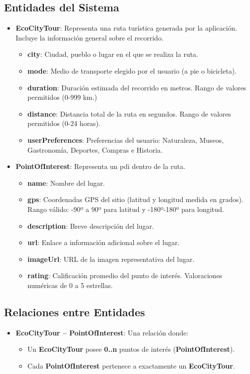 \subsection{Entidades del Sistema}
\begin{itemize}
	\item \textbf{EcoCityTour}: Representa una ruta turística generada por la aplicación. Incluye la información general sobre el recorrido.
	\begin{itemize}
		\item \textbf{city}: Ciudad, pueblo o lugar en el que se realiza la ruta.
		\item \textbf{mode}: Medio de transporte elegido por el usuario (a pie o bicicleta).
		\item \textbf{duration}: Duración estimada del recorrido en metros. Rango de valores permitidos (0-999 km.)
		\item \textbf{distance}: Distancia total de la ruta en segundos. Rango de valores permitidos (0-24 horas).
		\item \textbf{userPreferences}: Preferencias del usuario: Naturaleza, Museos, Gastronomía, Deportes, Compras e Historia.
	\end{itemize}

	\item {\textbf{PointOfInterest}}: Representa un \acrlong{pdi} dentro de la ruta.
	\begin{itemize}
		\item \textbf{name}: Nombre del lugar.
		\item \textbf{gps}: Coordenadas GPS del sitio (latitud y longitud medida en grados). Rango válido: -90º a 90º para latitud y -180º-180º para longitud.
		\item \textbf{description}: Breve descripción del lugar.
		\item \textbf{url}: Enlace a información adicional sobre el lugar.
		\item \textbf{imageUrl}: URL de la imagen representativa del lugar.
		\item \textbf{rating}: Calificación promedio del punto de interés. Valoraciones numéricas de 0 a 5 estrellas.
	\end{itemize}
\end{itemize}

\subsection{Relaciones entre Entidades}
\begin{itemize}
	\item \textbf{EcoCityTour -- PointOfInterest}: Una relación  donde:
	\begin{itemize}
		\item Un \textbf{EcoCityTour} posee \textbf{0..n} puntos de interés (\textbf{PointOfInterest}).
		\item Cada \textbf{PointOfInterest} pertenece a exactamente un \textbf{EcoCityTour}.
	\end{itemize}
\end{itemize}

